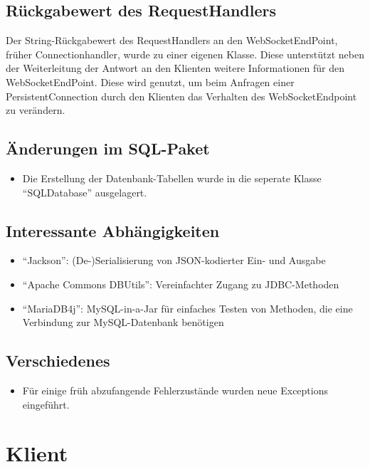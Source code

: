 \documentclass[parskip=full,11pt]{scrartcl}
\begin{document}
\subsection{Rückgabewert des RequestHandlers}
Der String-Rückgabewert des RequestHandlers an den WebSocketEndPoint, früher
Connectionhandler, wurde zu einer eigenen Klasse. Diese unterstützt neben der
Weiterleitung der Antwort an den Klienten weitere Informationen für den
WebSocketEndPoint. Diese wird genutzt, um beim Anfragen einer
PersistentConnection durch den Klienten das Verhalten des WebSocketEndpoint zu
verändern.

\subsection{Änderungen im SQL-Paket}
	\begin{itemize}
		\item Die Erstellung der Datenbank-Tabellen wurde in die seperate
			Klasse \enquote{SQLDatabase} ausgelagert.
	\end{itemize}

\subsection{Interessante Abhängigkeiten}
	\begin{itemize}
		\item \enquote{Jackson}:
			(De-)Serialisierung von JSON-kodierter Ein- und Ausgabe
		\item \enquote{Apache Commons DBUtils}:
			Vereinfachter Zugang zu JDBC-Methoden
		\item \enquote{MariaDB4j}:
			MySQL-in-a-Jar für einfaches Testen von Methoden, die eine
			Verbindung zur MySQL-Datenbank benötigen
	\end{itemize}

\subsection{Verschiedenes}
	\begin{itemize}
	\item Für einige früh abzufangende Fehlerzustände wurden neue Exceptions
		eingeführt.
	\end{itemize}

\pagebreak
\section{Klient}
\end{document}
